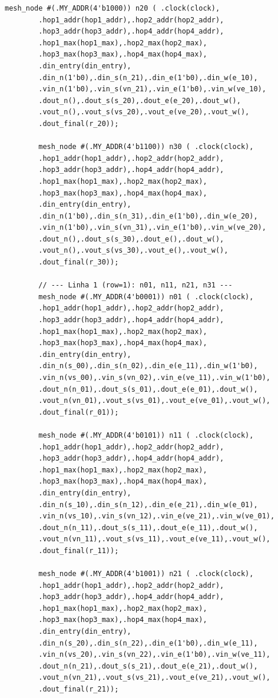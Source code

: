 \documentclass[12pt, a4paper]{article}
\begin{document}
\begin{lstlisting}[style=verilog, caption={\texttt{mesh\_4x4.v} --- Estrutura de interligação dos 16 nós da rede \textit{mesh} 4$\times$4, com fiação completa de dados e sinais de validade.}, label={lst:mesh4x4}]
		mesh_node #(.MY_ADDR(4'b1000)) n20 ( .clock(clock),
		.hop1_addr(hop1_addr),.hop2_addr(hop2_addr),
		.hop3_addr(hop3_addr),.hop4_addr(hop4_addr),
		.hop1_max(hop1_max),.hop2_max(hop2_max),
		.hop3_max(hop3_max),.hop4_max(hop4_max),
		.din_entry(din_entry),
		.din_n(1'b0),.din_s(n_21),.din_e(1'b0),.din_w(e_10),
		.vin_n(1'b0),.vin_s(vn_21),.vin_e(1'b0),.vin_w(ve_10),
		.dout_n(),.dout_s(s_20),.dout_e(e_20),.dout_w(),
		.vout_n(),.vout_s(vs_20),.vout_e(ve_20),.vout_w(),
		.dout_final(r_20));
		
		mesh_node #(.MY_ADDR(4'b1100)) n30 ( .clock(clock),
		.hop1_addr(hop1_addr),.hop2_addr(hop2_addr),
		.hop3_addr(hop3_addr),.hop4_addr(hop4_addr),
		.hop1_max(hop1_max),.hop2_max(hop2_max),
		.hop3_max(hop3_max),.hop4_max(hop4_max),
		.din_entry(din_entry),
		.din_n(1'b0),.din_s(n_31),.din_e(1'b0),.din_w(e_20),
		.vin_n(1'b0),.vin_s(vn_31),.vin_e(1'b0),.vin_w(ve_20),
		.dout_n(),.dout_s(s_30),.dout_e(),.dout_w(),
		.vout_n(),.vout_s(vs_30),.vout_e(),.vout_w(),
		.dout_final(r_30));
		
		// --- Linha 1 (row=1): n01, n11, n21, n31 ---
		mesh_node #(.MY_ADDR(4'b0001)) n01 ( .clock(clock),
		.hop1_addr(hop1_addr),.hop2_addr(hop2_addr),
		.hop3_addr(hop3_addr),.hop4_addr(hop4_addr),
		.hop1_max(hop1_max),.hop2_max(hop2_max),
		.hop3_max(hop3_max),.hop4_max(hop4_max),
		.din_entry(din_entry),
		.din_n(s_00),.din_s(n_02),.din_e(e_11),.din_w(1'b0),
		.vin_n(vs_00),.vin_s(vn_02),.vin_e(ve_11),.vin_w(1'b0),
		.dout_n(n_01),.dout_s(s_01),.dout_e(e_01),.dout_w(),
		.vout_n(vn_01),.vout_s(vs_01),.vout_e(ve_01),.vout_w(),
		.dout_final(r_01));
		
		mesh_node #(.MY_ADDR(4'b0101)) n11 ( .clock(clock),
		.hop1_addr(hop1_addr),.hop2_addr(hop2_addr),
		.hop3_addr(hop3_addr),.hop4_addr(hop4_addr),
		.hop1_max(hop1_max),.hop2_max(hop2_max),
		.hop3_max(hop3_max),.hop4_max(hop4_max),
		.din_entry(din_entry),
		.din_n(s_10),.din_s(n_12),.din_e(e_21),.din_w(e_01),
		.vin_n(vs_10),.vin_s(vn_12),.vin_e(ve_21),.vin_w(ve_01),
		.dout_n(n_11),.dout_s(s_11),.dout_e(e_11),.dout_w(),
		.vout_n(vn_11),.vout_s(vs_11),.vout_e(ve_11),.vout_w(),
		.dout_final(r_11));
		
		mesh_node #(.MY_ADDR(4'b1001)) n21 ( .clock(clock),
		.hop1_addr(hop1_addr),.hop2_addr(hop2_addr),
		.hop3_addr(hop3_addr),.hop4_addr(hop4_addr),
		.hop1_max(hop1_max),.hop2_max(hop2_max),
		.hop3_max(hop3_max),.hop4_max(hop4_max),
		.din_entry(din_entry),
		.din_n(s_20),.din_s(n_22),.din_e(1'b0),.din_w(e_11),
		.vin_n(vs_20),.vin_s(vn_22),.vin_e(1'b0),.vin_w(ve_11),
		.dout_n(n_21),.dout_s(s_21),.dout_e(e_21),.dout_w(),
		.vout_n(vn_21),.vout_s(vs_21),.vout_e(ve_21),.vout_w(),
		.dout_final(r_21));
		

\end{lstlisting}
\end{document}
